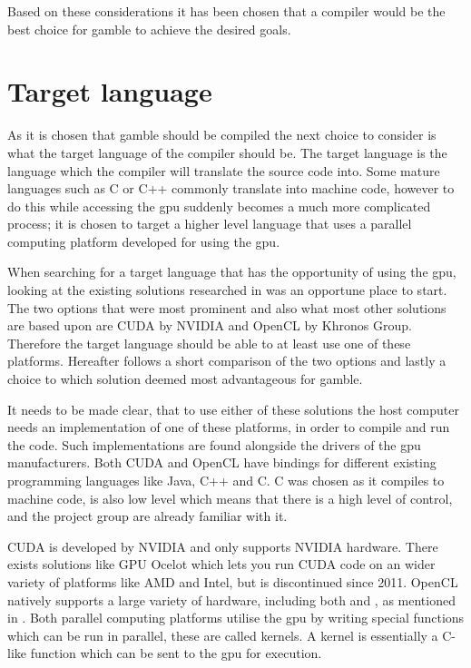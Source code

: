 Based on these considerations it has been chosen that a compiler would be the best choice for \gls{gamble} to achieve the desired goals.

\section{Target language}\label{CUDAvsOpenCL}
As it is chosen that \gls{gamble} should be compiled the next choice to consider is what the target language of the compiler should be.
The target language is the language which the compiler will translate the source code into.
Some mature languages such as C or C++ commonly translate into machine code, however to do this while accessing the \acrshort{gpu} suddenly becomes a much more complicated process; it is chosen to target a higher level language that uses a parallel computing platform developed for using the \acrshort{gpu}.

When searching for a target language that has the opportunity of using the \acrshort{gpu}, looking at the existing solutions researched in  was an opportune place to start.
The two options that were most prominent and also what most other solutions are based upon are CUDA by NVIDIA and OpenCL by Khronos Group.
Therefore the target language should be able to at least use one of these platforms. 
Hereafter follows a short comparison of the two options and lastly a choice to which solution deemed most advantageous for \gls{gamble}.

It needs to be made clear, that to use either of these solutions the host computer needs an implementation of one of these platforms, in order to compile and run the code.
Such implementations are found alongside the drivers of the \gls{gpu} manufacturers.
Both CUDA and OpenCL have bindings for different existing programming languages like Java, C++ and C.
C was chosen as it compiles to machine code, is also low level which means that there is a high level of control, and the project group are already familiar with it. 

CUDA is developed by NVIDIA and only supports NVIDIA hardware.
There exists solutions like GPU Ocelot which lets you run CUDA code on an wider variety of platforms like AMD and Intel, but is discontinued since 2011. \citep{Diamos:2010:ODO:1854273.1854318}
OpenCL natively supports a large variety of hardware, including both  and , as mentioned in .
Both parallel computing platforms utilise the \acrshort{gpu} by writing special functions which can be run in parallel, these are called kernels.
A kernel is essentially a C-like function which can be sent to the \acrshort{gpu} for execution.

